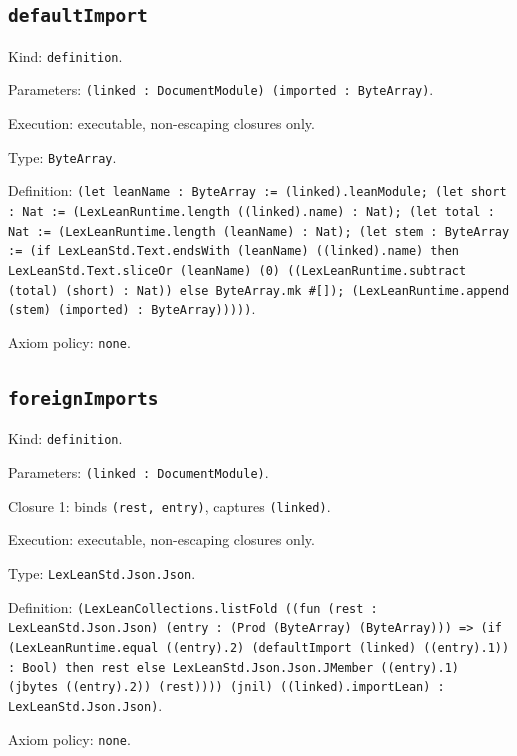 \documentclass[11pt]{article}
\begin{document}
\subsection*{\texttt{defaultImport}}
\noindent Kind: \texttt{definition}.\par
\noindent Parameters: \texttt{(linked : DocumentModule) (imported : ByteArray)}.\par
\noindent Execution: executable, non-escaping closures only.\par
\noindent Type: \texttt{ByteArray}.\par
\noindent Definition: \texttt{(let leanName : ByteArray := (linked).leanModule; (let short : Nat := (LexLeanRuntime.length ((linked).name) : Nat); (let total : Nat := (LexLeanRuntime.length (leanName) : Nat); (let stem : ByteArray := (if LexLeanStd.Text.endsWith (leanName) ((linked).name) then LexLeanStd.Text.sliceOr (leanName) (0) ((LexLeanRuntime.subtract (total) (short) : Nat)) else ByteArray.mk \#[]); (LexLeanRuntime.append (stem) (imported) : ByteArray)))))}.\par
\noindent Axiom policy: \texttt{none}.\par
\subsection*{\texttt{foreignImports}}
\noindent Kind: \texttt{definition}.\par
\noindent Parameters: \texttt{(linked : DocumentModule)}.\par
\noindent Closure 1: binds \texttt{(rest, entry)}, captures \texttt{(linked)}.\par
\noindent Execution: executable, non-escaping closures only.\par
\noindent Type: \texttt{LexLeanStd.Json.Json}.\par
\noindent Definition: \texttt{(LexLeanCollections.listFold ((fun (rest : LexLeanStd.Json.Json) (entry : (Prod (ByteArray) (ByteArray))) => (if (LexLeanRuntime.equal ((entry).2) (defaultImport (linked) ((entry).1)) : Bool) then rest else LexLeanStd.Json.Json.JMember ((entry).1) (jbytes ((entry).2)) (rest)))) (jnil) ((linked).importLean) : LexLeanStd.Json.Json)}.\par
\noindent Axiom policy: \texttt{none}.\par
\end{document}
